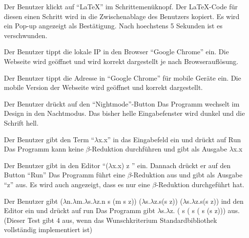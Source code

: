 \documentclass[parskip=full,11pt,twoside]{scrartcl}
\begin{document}
{Der Benutzer klickt auf \enquote{LaTeX} im Schrittemenüknopf.}
{Der LaTeX-Code für diesen einen Schritt wird in die Zwischenablage des Benutzers kopiert.
Es wird ein Pop-up angezeigt als Bestätigung. Nach hoechstens 5 Sekunden ist es verschwunden.}

{Der Benutzer tippt die lokale IP in den Browser \enquote {Google Chrome} ein.}
{Die Webseite wird geöffnet und wird korrekt dargestellt je nach Browserauflösung.}

{Der Benutzer tippt die Adresse in \enquote{Google Chrome} für mobile Geräte ein.}
{Die mobile Version der Webseite wird geöffnet und korrekt dargestellt.}

{Der Benutzer drückt auf den \enquote{Nightmode}-Button}
{Das Programm wechselt im Design in den Nachtmodus. Das bisher helle Eingabefenster wird dunkel und die Schrift hell.}





{Der Benutzer gibt den Term \enquote {$\lambda$x.x} in das Eingabefeld ein und drückt auf Run}
{Das Programm kann keine $\beta$-Reduktion durchführen und gibt als Ausgabe $\lambda$x.x}

{ Der Benutzer gibt in den Editor \enquote {($\lambda$x.x) z } ein. Dannach drückt er auf den Button \enquote {Run}}
{ Das Programm führt eine $\beta$-Reduktion aus und gibt als Ausgabe \enquote {z} aus. Es wird auch angezeigt, dass es nur eine $\beta$-Reduktion durchgeführt hat.}

{Der Benutzer gibt \newline ($\lambda$n.$\lambda$m.$\lambda$s.$\lambda$z.n s (m s z)) ($\lambda$s.$\lambda$z.s(s z)) ($\lambda$s.$\lambda$z.s(s z)) ind den Editor ein und drückt auf run}
{Das Programm gibt $\lambda$s.$\lambda$z. ( s ( s ( s (s z))) aus. (Dieser Test gibt 4 aus, wenn das Wunschkriterium Standardbibliothek vollständig implementiert ist) }
\end{document}
